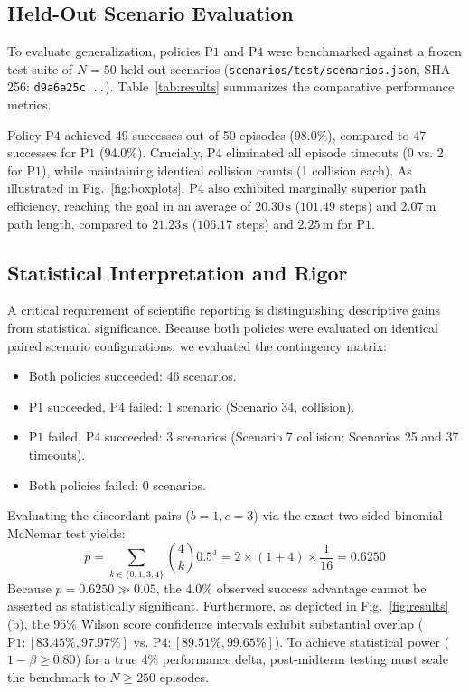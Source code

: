 \documentclass[conference]{IEEEtran}
\begin{document}
\subsection{Held-Out Scenario Evaluation}
To evaluate generalization, policies $\text{P1}$ and $\text{P4}$ were benchmarked against a frozen test suite of $N=50$ held-out scenarios (\texttt{scenarios/test/scenarios.json}, SHA-256: \texttt{d9a6a25c...}). Table~\ref{tab:results} summarizes the comparative performance metrics.

Policy $\text{P4}$ achieved 49 successes out of 50 episodes (98.0\%), compared to 47 successes for $\text{P1}$ (94.0\%). Crucially, $\text{P4}$ eliminated all episode timeouts (0 vs. 2 for $\text{P1}$), while maintaining identical collision counts (1 collision each). As illustrated in Fig.~\ref{fig:boxplots}, $\text{P4}$ also exhibited marginally superior path efficiency, reaching the goal in an average of $20.30\,\text{s}$ ($101.49$ steps) and $2.07\,\text{m}$ path length, compared to $21.23\,\text{s}$ ($106.17$ steps) and $2.25\,\text{m}$ for $\text{P1}$.

\subsection{Statistical Interpretation and Rigor}
A critical requirement of scientific reporting is distinguishing descriptive gains from statistical significance. Because both policies were evaluated on identical paired scenario configurations, we evaluated the contingency matrix:
\begin{itemize}
    \item Both policies succeeded: 46 scenarios.
    \item $\text{P1}$ succeeded, $\text{P4}$ failed: 1 scenario (Scenario 34, collision).
    \item $\text{P1}$ failed, $\text{P4}$ succeeded: 3 scenarios (Scenario 7 collision; Scenarios 25 and 37 timeouts).
    \item Both policies failed: 0 scenarios.
\end{itemize}

Evaluating the discordant pairs ($b=1, c=3$) via the exact two-sided binomial McNemar test yields:
\begin{equation}
p = \sum_{k \in \{0, 1, 3, 4\}} \binom{4}{k} 0.5^4 = 2 \times (1 + 4) \times \frac{1}{16} = 0.6250
\end{equation}
Because $p = 0.6250 \gg 0.05$, the 4.0\% observed success advantage cannot be asserted as statistically significant. Furthermore, as depicted in Fig.~\ref{fig:results}(b), the 95\% Wilson score confidence intervals exhibit substantial overlap ($\text{P1}: [83.45\%, 97.97\%]$ vs. $\text{P4}: [89.51\%, 99.65\%]$). To achieve statistical power ($1-\beta \ge 0.80$) for a true 4\% performance delta, post-midterm testing must scale the benchmark to $N \ge 250$ episodes.
\end{document}
